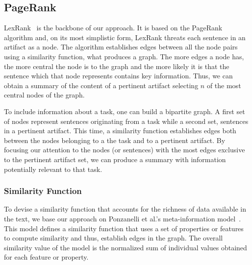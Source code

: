 


\subsection{PageRank}




LexRank~\cite{Erkan2004} is the backbone of our approach. 
It is based on the PageRank~\cite{Page1999} algorithm
and, on its most simplistic form, LexRank threats each sentence in an artifact as a node.
The algorithm
establishes edges between all the node pairs using a similarity function, what produces a graph. 
The more edges a node has, the more central the node is to the graph and the more likely it is that the sentence which that node represents contains key information. 
 Thus, we can obtain a summary of the content of a pertinent artifact selecting $n$ of the most central nodes of the graph. 


To include information about a task, one can build a bipartite graph.
A first set of nodes represent sentences originating from a task while a second set, sentences in a pertinent artifact.
This time,  a similarity function 
establishes edges both between the nodes belonging to a the task and to a pertinent artifact.
By focusing our attention to the nodes (or sentences) with the most edges 
exclusive to the pertinent artifact set, we can produce a summary with information potentially relevant to that task.






\subsubsection{Similarity Function}


  
To devise a similarity function that accounts for the richness of data available in the text, we base our approach on Ponzanelli et al.'s meta-information model~\cite{Ponzanelli2015}.
 This model defines a similarity function that uses a set of properties or features to compute similarity and thus, establish edges in the graph.
The overall similarity value of the model is the normalized sum of individual values obtained for each feature or property.


